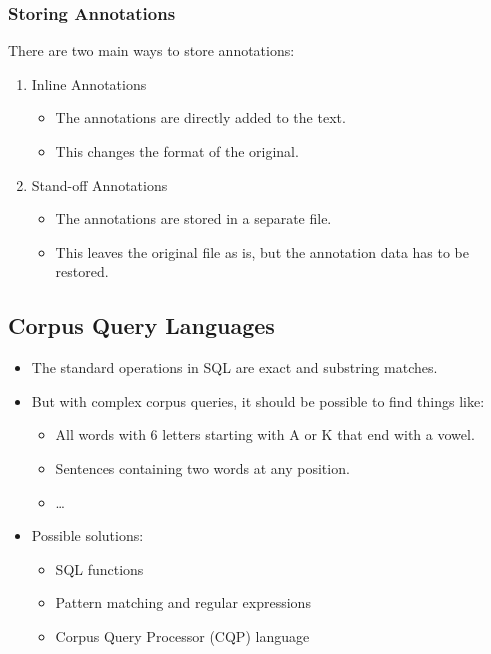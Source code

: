 			\subsubsection{Storing Annotations} %
				There are two main ways to store annotations:
				\begin{enumerate}
					\item Inline Annotations
						\begin{itemize}
							\item The annotations are directly added to the text.
							\item This changes the format of the original.
						\end{itemize}
					\item Stand-off Annotations
						\begin{itemize}
							\item The annotations are stored in a separate file.
							\item This leaves the original file as is, but the annotation data has to be restored.
						\end{itemize}
				\end{enumerate}

		\subsection{Corpus Query Languages} %
			\begin{itemize}
				\item The standard operations in SQL are exact and substring matches.
				\item But with complex corpus queries, it should be possible to find things like:
					\begin{itemize}
						\item All words with 6 letters starting with A or K that end with a vowel.
						\item Sentences containing two words at any position.
						\item \dots
					\end{itemize}
				\item Possible solutions:
					\begin{itemize}
						\item SQL functions
						\item Pattern matching and regular expressions
						\item Corpus Query Processor (CQP) language
					\end{itemize}
			\end{itemize}

